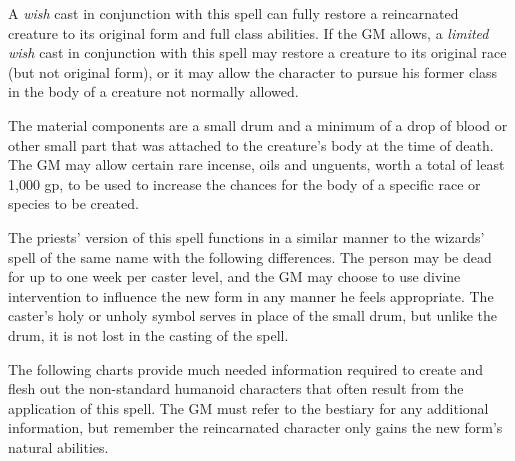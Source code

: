 \begin{multicols}{2}
A \textit{wish} cast in conjunction with this spell can fully restore a reincarnated creature to its original form and full class abilities.  If the GM allows, a \textit{limited wish} cast in conjunction with this spell may restore a creature to its original race (but not original form), or it may allow the character to pursue his former class in the body of a creature not normally allowed.

The material components are a small drum and a minimum of a drop of blood or other small part that was attached to the creature's body at the time of death.  The GM may allow certain rare incense, oils and unguents, worth a total of least 1,000 gp, to be used to increase the chances for the body of a specific race or species to be created.

The priests' version of this spell functions in a similar manner to the wizards' spell of the same name with the following differences.  The person may be dead for up to one week per caster level, and the GM may choose to use divine intervention to influence the new form in any manner he feels appropriate.  The caster's holy or unholy symbol serves in place of the small drum, but unlike the drum, it is not lost in the casting of the spell.

The following charts provide much needed information required to create and flesh out the non-standard humanoid characters that often result from the application of this spell.  The GM must refer to the bestiary for any additional information, but remember the reincarnated character only gains the new form's natural abilities.

\noindent
\begin{minipage}{\columnwidth}


\end{minipage}
\end{multicols}
